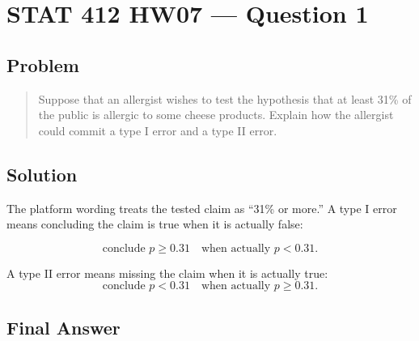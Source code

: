 \documentclass[11pt]{article}
\begin{document}
\section*{STAT 412 HW07 --- Question 1}

\subsection*{Problem}

\begin{quote}
Suppose that an allergist wishes to test the hypothesis that at least 31\% of the public is allergic to some cheese products. Explain how the allergist could commit a type I error and a type II error.
\end{quote}

\subsection*{Solution}

The platform wording treats the tested claim as ``31\% or more.'' A type I error means concluding the claim is true when it is actually false:

\[
\text{conclude }p\ge0.31\quad\text{when actually }p<0.31.
\]

A type II error means missing the claim when it is actually true:
\[
\text{conclude }p<0.31\quad\text{when actually }p\ge0.31.
\]

\subsection*{Final Answer}

\end{document}
